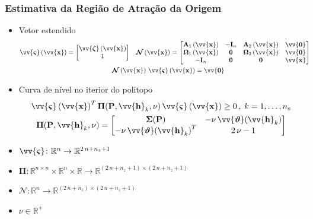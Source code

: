 \documentclass{beamer}
\newcommand*{\Round}[1]{\left(#1\right)}
\newcommand*{\Prod}{\,}
\newcommand*{\Bold}[1]{\boldsymbol{\mathbf{#1}}}
\newcommand*{\Matr}[1]{\Bold{#1}}
\newcommand*{\Vect}[1]{\vv{\Bold{#1}}}
\newcommand*{\Transp}[1]{{#1}^{T}}
\renewcommand{\Prod}{\,}
\begin{document}
\begin{frame}\frametitle{Estimativa da Região de Atração da Origem}
  \begin{itemize}
    \item Vetor estendido
    \begin{gather}
      \begin{aligned}
        \Vect{\varsigma}\Round{\Vect{x}}
        &= \begin{bmatrix} \Vect{\zeta}\Round{\Vect{x}} \\ 1 \end{bmatrix}
        &
        \Matr{\mathcal{N}}\Round{\Vect{x}}
        &= \begin{bmatrix}
          \Matr{A}_1\Round{\Vect{x}}      & -\Matr{I}_n & \Matr{A}_2\Round{\Vect{x}}      & \Vect{0} \\
          \Matr{\Omega}_1\Round{\Vect{x}} & \Matr{0}    & \Matr{\Omega}_2\Round{\Vect{x}} & \Vect{0} \\
          -\Matr{I}_n                     & \Matr{0}    & \Matr{0}                        & \Vect{x} \\
        \end{bmatrix}
      \end{aligned}
      \\
      \Matr{\mathcal{N}}\Round{\Vect{x}} \Prod \Vect{\varsigma}\Round{\Vect{x}} = \Vect{0}
    \end{gather}
    \item Curva de nível no iterior do politopo
    \begin{gather}
      \Transp{\Vect{\varsigma}\Round{\Vect{x}}} \Prod \Matr{\Pi}(\Matr{P}, \Vect{h}_k, \nu) \Prod \Vect{\varsigma}\Round{\Vect{x}} \geq 0
      \,,\; k = 1, \dotsc, n_e
      \\
      \Matr{\Pi}(\Matr{P}, \Vect{h}_k, \nu) = \begin{bmatrix}
        \Matr{\Sigma}(\Matr{P})                          & -\nu \Prod \Vect{\vartheta}(\Vect{h}_k) \\
        -\nu \Prod \Transp{\Vect{\vartheta}(\Vect{h}_k)} & 2 \Prod \nu - 1                         \\
      \end{bmatrix}
    \end{gather}
    \item $\Vect{\varsigma} \colon \mathbb{R}^n \to \mathbb{R}^{2 \Prod n + n_z + 1}$
    \item $\Matr{\Pi} \colon \mathbb{R}^{n \times n} \times \mathbb{R}^n \times \mathbb{R} \to \mathbb{R}^{(2 \Prod n + n_z + 1) \times (2 \Prod n + n_z + 1)}$
    \item $\Matr{\mathcal{N}} \colon \mathbb{R}^n \to \mathbb{R}^{(2 \Prod n + n_z) \times (2 \Prod n + n_z + 1)}$
    \item $\nu \in \mathbb{R}^+$
  \end{itemize}
\end{frame}
\end{document}
